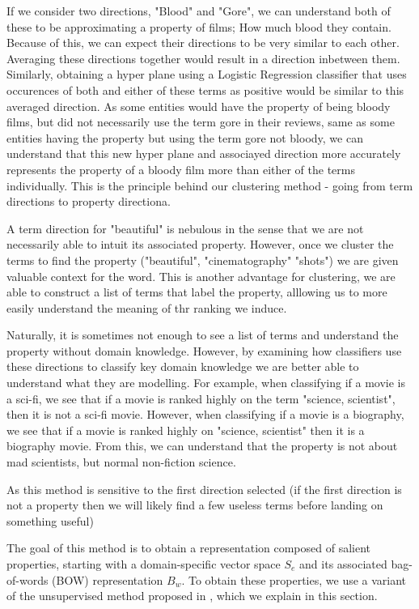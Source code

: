 If we consider two directions, "Blood" and "Gore", we can understand both of these to be approximating a property of films; How much blood they contain. Because of this, we can expect their directions to be very similar to each other. Averaging these directions together would result in a direction inbetween them. Similarly, obtaining a hyper plane using a Logistic Regression classifier that uses occurences of both and either of these terms as positive would be similar to this averaged direction. As some entities would have the property of being bloody films, but did not necessarily use the term gore in their reviews, same as some entities having the property but using the term gore not bloody, we can understand that this new hyper plane and associayed direction more accurately represents the property of a bloody film more than either of the terms individually. This is the principle behind our clustering method - going from term directions to property directiona.

A term direction for "beautiful" is nebulous in the sense that we are not necessarily able to intuit its associated property. However, once we cluster the terms to find the property ("beautiful", "cinematography" "shots") we are given valuable context for the word. This is another advantage for clustering, we are able to construct a list of terms that label the property, alllowing us to more easily understand the meaning of thr ranking we induce.

Naturally, it is sometimes not enough to see a list of terms and understand the property without domain knowledge. However, by examining how classifiers use these directions to classify key domain knowledge we are better able to understand what they are modelling. For example, when classifying if a movie is a sci-fi, we see that if a movie is ranked highly on the term "science, scientist", then it is not a sci-fi movie. However, when classifying if a movie is a biography, we see that if a movie is ranked highly on "science, scientist" then it is a biography movie. From this, we can understand that the property is not about mad scientists, but normal non-fiction science. 

As this method is sensitive to the first direction selected (if the first direction is not a property then we will likely find a few useless terms before landing on something useful) %

The goal of this method is to obtain a representation composed of salient properties, starting with a domain-specific vector space $S_e$ and its associated bag-of-words (BOW) representation $B_w$. To obtain these properties, we use a variant of the unsupervised method proposed in \cite{derracAIJ}, which we explain in this section. 
